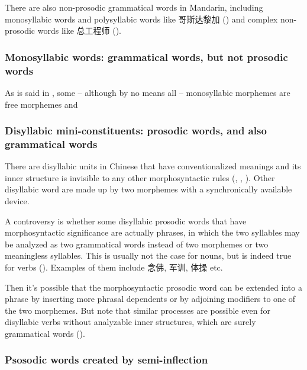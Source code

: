 \documentclass[UTF8, a4paper, oneside, scheme=plain, 12pt]{ctexrep}
\begin{document}
There are also non-prosodic grammatical words in Mandarin,
including monosyllabic words and polysyllabic words like 哥斯达黎加 
()
and complex non-prosodic words like 
总工程师 ().


\subsubsection{Monosyllabic words: grammatical words, but not prosodic words}\label{sec:pos.word.monosyllabic}

As is said in , 
some -- although by no means all -- monosyllabic morphemes 
are free morphemes and

\subsubsection{Disyllabic mini-constituents: prosodic words, and also grammatical words}\label{sec:pos.architecture.word.mini-constituent}

There are disyllabic units in Chinese 
that have conventionalized meanings and its inner structure is invisible 
to any other morphosyntactic rules 
(,
,
).
Other disyllabic word are made up by two morphemes with a synchronically available device.

A controversy is whether some disyllabic prosodic words that have morphosyntactic significance
are actually phrases,
in which the two syllables may be analyzed 
as two grammatical words
instead of two morphemes or two meaningless syllables.
This is usually not the case for nouns, 
but is indeed true for verbs
().
Examples of them include 念佛, 军训, 体操 etc. 

Then it's possible that the morphosyntactic prosodic word can be extended into a phrase 
by inserting more phrasal dependents 
or by adjoining modifiers to one of the two morphemes.
But note that similar processes are possible even for 
disyllabic verbs without analyzable inner structures,
which are surely grammatical words ().

\subsubsection{Psosodic words created by semi-inflection}\label{sec:pos.architecture.word-confusing.constituent}
\end{document}
